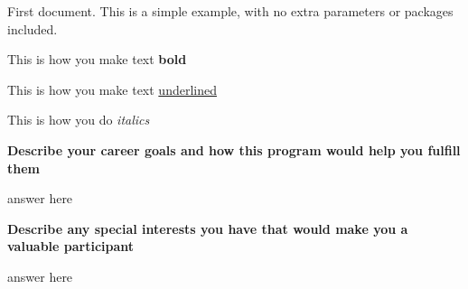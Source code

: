 \documentclass{article}
\begin{document}
First document. This is a simple example, with no 
extra parameters or packages included.

This is how you make text \textbf{bold}

This is how you make text \underline{underlined} 

This is how you do \textit{italics}

\textbf{Describe your career goals and how this program would help you fulfill them}

answer here

\textbf{Describe any special interests you have that would make you a valuable participant}

answer here

\end{document}
